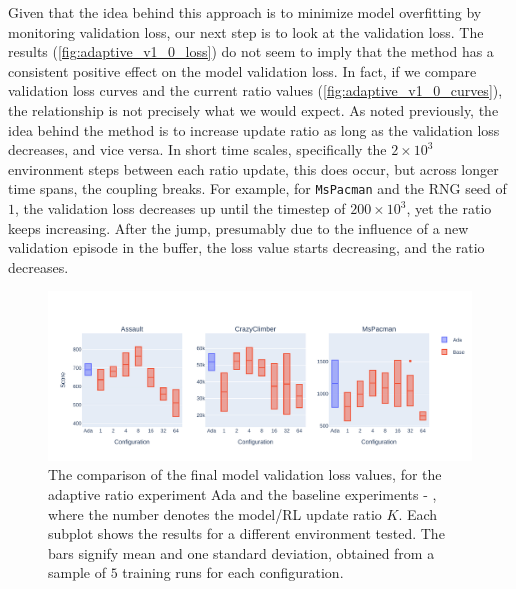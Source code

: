 \documentclass[en]{pracamgr}
\newcommand{\env}[1]{{\tt #1}}
\newcommand{\figurewidth}{\linewidth}
\newcommand{\figureheight}{0.8\paperheight}
\begin{document}
Given that the idea behind this approach is to minimize model overfitting by monitoring validation loss, our next step is to look at the validation loss. The results (\autoref{fig:adaptive_v1_0_loss}) do not seem to imply that the method has a consistent positive effect on the model validation loss. In fact, if we compare validation loss curves and the current ratio values (\autoref{fig:adaptive_v1_0_curves}), the relationship is not precisely what we would expect. As noted previously, the idea behind the method is to increase update ratio as long as the validation loss decreases, and vice versa. In short time scales, specifically the $2 \times 10^3$ environment steps between each ratio update, this does occur, but across longer time spans, the coupling breaks. For example, for \env{MsPacman} and the RNG seed of $1$, the validation loss decreases up until the timestep of $200 \times 10^3$, yet the ratio keeps increasing. After the jump, presumably due to the influence of a new validation episode in the buffer, the loss value starts decreasing, and the ratio decreases.

\begin{figure}
  \centering
  \includegraphics[width=\figurewidth,height=\figureheight,keepaspectratio]{assets/adaptive_v1_0.val_loss.pdf}
  \caption{The comparison of the final model validation loss values, for the adaptive ratio experiment {\sf Ada} and the baseline experiments {} - {}, where the number denotes the model/RL update ratio $K$. Each subplot shows the results for a different environment tested. The bars signify mean and one standard deviation, obtained from a sample of $5$ training runs for each configuration.}
  \label{fig:adaptive_v1_0_loss}
\end{figure}
\end{document}
